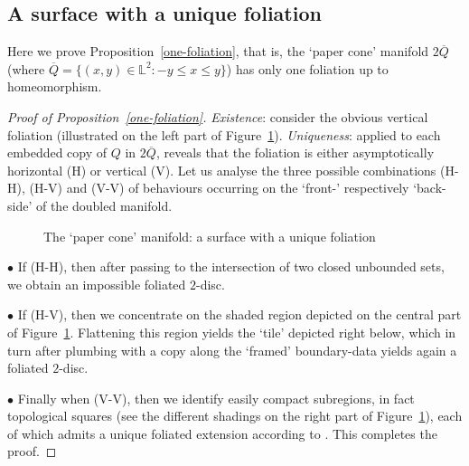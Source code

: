 \documentclass{amsart}
\begin{document}
\subsection{A surface with a unique foliation}\label{sec-one-foliation}

Here we prove Proposition~\ref{one-foliation}, that is, the `paper cone' manifold $2\overline{Q}$ (where $\overline{Q}=\{(x,y)\in {\mathbb L}^2 : -y \le x\le y\}$) has only one foliation up to homeomorphism.

\begin{proof}[Proof of Proposition~\ref{one-foliation}] 
{\it Existence}: consider the obvious vertical foliation (illustrated on the left part of Figure~\ref{cornet}). {\it Uniqueness}: \cite[Proposition~6.1]{BGG} applied to each embedded copy of $Q$ in $2\overline{Q}$, reveals that the foliation is either asymptotically horizontal (H) or vertical (V). Let us analyse the three possible combinations (H-H), (H-V) and (V-V) of behaviours occurring on the `front-' respectively `back-side' of the doubled manifold.

\begin{figure}[h]
\centering
    \caption{\label{cornet} The `paper cone' manifold: a surface with a unique foliation}
\iffalse\begin{picture}(210,0)(0,0)
\put(85,54){ \epsfig{figure=blank.PNG,width=18mm}}
\put(85,60){ \epsfig{figure=blank.PNG,width=8mm}}
\put(95,60){ \epsfig{figure=blank.PNG,width=8mm}}
\put(84,58){{\fontfamily{venturis} \tiny{\cite[Lemma~6.4]{BGG}}}}
 \end{picture}\fi
\end{figure}

$\bullet$ If (H-H), then after passing to the intersection of two closed unbounded sets, we obtain an impossible foliated $2$-disc.

$\bullet$ If (H-V), then we concentrate on the shaded region depicted on the central part of Figure~\ref{cornet}. Flattening this region yields the `tile' depicted right below, which in turn after plumbing with a copy along the `framed' boundary-data yields again a foliated $2$-disc.

$\bullet$ Finally when (V-V), then we identify easily compact subregions, in fact topological squares (see the different shadings on the right part of Figure~\ref{cornet}), each of which  admits a unique foliated extension according to \cite[Lemma~6.4]{BGG}. This completes the proof.
\end{proof}
\end{document}
